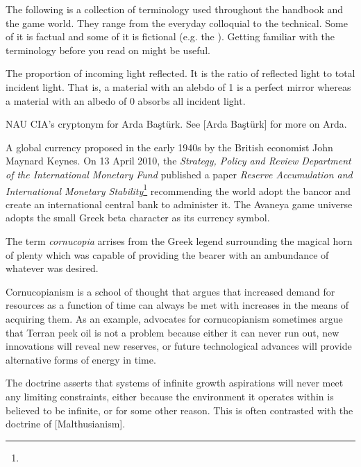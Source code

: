 

The following is a collection of terminology used throughout the handbook and the game world. They range from the everyday colloquial to the technical. Some of it is factual and some of it is fictional (e.g. the {\it \about[Jenya]}). Getting familiar with the terminology before you read on might be useful.

The proportion of incoming light reflected. It is the ratio of reflected light to total incident light. That is, a material with an alebdo of 1 is a perfect mirror whereas a material with an albedo of 0 absorbs all incident light.

NAU CIA's cryptonym for Arda Baştürk. See [Arda Baştürk] for more on Arda.

A global currency proposed in the early 1940s by the British economist John Maynard Keynes. On 13 April 2010, the {\it Strategy, Policy and Review Department of the International Monetary Fund} published a paper {\it Reserve Accumulation and International Monetary Stability}\footnote{} recommending the world adopt the bancor and create an international central bank to administer it. The Avaneya game universe adopts the small Greek beta character  as its currency symbol.

The term {\it cornucopia} arrises from the Greek legend surrounding the magical horn of plenty which was capable of providing the bearer with an ambundance of whatever was desired.

Cornucopianism is a school of thought that argues that increased demand for resources as a function of time can always be met with increases in the means of acquiring them. As an example, advocates for cornucopianism sometimes argue that Terran peek oil is not a problem because either it can never run out, new innovations will reveal new reserves, or future technological advances will provide alternative forms of energy in time. 

The doctrine asserts that systems of infinite growth aspirations will never meet any limiting constraints, either because the environment it operates within is believed to be infinite, or for some other reason. This is often contrasted with the doctrine of [Malthusianism].

